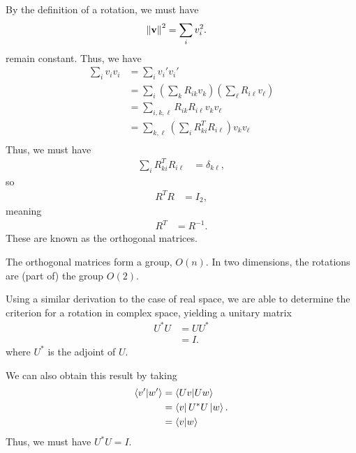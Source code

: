\documentclass[10pt]{mypackage}
\begin{document}
\begin{example}
  By the definition of a rotation, we must have
  \begin{align*}
    \norm{\mathbf{v}}^2 &= \sum_{i}v_i^2.
  \end{align*}
  remain constant. Thus, we have
  \begin{align*}
    \sum_{i}v_iv_i &= \sum_{i}v_i'v_i'\\
                  &= \sum_{i}\left(\sum_{k}R_{ik}v_k\right)\left(\sum_{\ell}R_{i\ell}v_{\ell}\right)\\
                  &= \sum_{i,k,\ell}R_{ik}R_{i\ell}v_{k}v_{\ell}\\
                  &= \sum_{k,\ell}\left(\sum_{i}R_{ki}^{T}R_{i\ell}\right)v_{k}v_{\ell}\\
  \end{align*}
  Thus, we must have
  \begin{align*}
    \sum_{i}R_{ki}^{T}R_{i\ell} &= \delta_{k\ell},
  \end{align*}
  so
  \begin{align*}
    R^{T}R &= I_{2},
  \end{align*}
  meaning
  \begin{align*}
    R^{T} &= R^{-1}.
  \end{align*}
  These are known as the orthogonal matrices.\newline

  The orthogonal matrices form a group, $O(n)$. In two dimensions, the rotations are (part of) the group $O(2)$.
\end{example}
\begin{example}
Using a similar derivation to the case of real space, we are able to determine the criterion for a rotation in complex space, yielding a unitary matrix
\begin{align*}
  U^{\ast}U &= UU^{\ast}\\
            &= I.
\end{align*}
where $U^{\ast}$ is the adjoint of $U$.\newline

We can also obtain this result by taking
\begin{align*}
  \braket{v'}{w'} &= \braket{Uv}{Uw}\\
                  &= \bra{v}U^{\ast}U\ket{w}.\\
                  &= \braket{v}{w}
\end{align*}
Thus, we must have $U^{\ast}U = I$.
\end{example}
\end{document}
